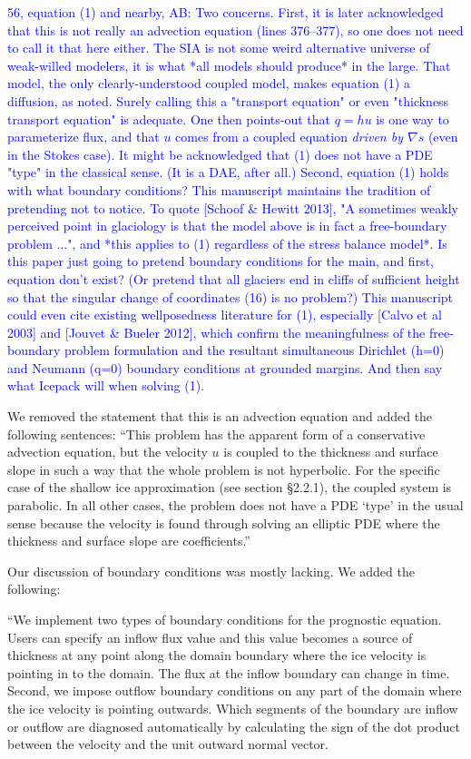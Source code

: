 \documentclass{article}
\theoremstyle{definition}
\theoremstyle{plain}
\begin{document}
\textcolor{blue}{56, equation (1) and nearby, AB:  Two concerns.  First, it is later acknowledged that this is not really an advection equation (lines 376--377), so one does not need to call it that here either.  The SIA is not some weird alternative universe of weak-willed modelers, it is what *all models should produce* in the large.  That model, the only clearly-understood coupled model, makes equation (1) a diffusion, as noted.  Surely calling this a "transport equation" or even "thickness transport equation" is adequate.  One then points-out that $q=hu$ is one way to parameterize flux, and that $u$ comes from a coupled equation \emph{driven by $\nabla s$} (even in the Stokes case).  It might be acknowledged that (1) does not have a PDE "type" in the classical sense.  (It is a DAE, after all.)  Second, equation (1) holds with what boundary conditions?  This manuscript maintains the tradition of pretending not to notice.  To quote [Schoof \& Hewitt 2013], "A sometimes weakly perceived point in glaciology is that the model above is in fact a free-boundary problem ...", and *this applies to (1) regardless of the stress balance model*.  Is this paper just going to pretend boundary conditions for the main, and first, equation don't exist?  (Or pretend that all glaciers end in cliffs of sufficient height so that the singular change of coordinates (16) is no problem?)  This manuscript could even cite existing wellposedness literature for (1), especially [Calvo et al 2003] and [Jouvet \& Bueler 2012], which confirm the meaningfulness of the free-boundary problem formulation and the resultant simultaneous Dirichlet (h=0) and Neumann (q=0) boundary conditions at grounded margins.  And then say what Icepack will when solving (1).}

We removed the statement that this is an advection equation and added the following sentences:
``This problem has the apparent form of a conservative advection equation, but the velocity $u$ is coupled to the thickness and surface slope in such a way that the whole problem is not hyperbolic.
For the specific case of the shallow ice approximation (see section \S2.2.1), the coupled system is parabolic.
In all other cases, the problem does not have a PDE `type' in the usual sense because the velocity is found through solving an elliptic PDE where the thickness and surface slope are coefficients.''

Our discussion of boundary conditions was mostly lacking.
We added the following:

``We implement two types of boundary conditions for the prognostic equation.
Users can specify an inflow flux value and this value becomes a source of thickness at any point along the domain boundary where the ice velocity is pointing in to the domain.
The flux at the inflow boundary can change in time.
Second, we impose outflow boundary conditions on any part of the domain where the ice velocity is pointing outwards.
Which segments of the boundary are inflow or outflow are diagnosed automatically by calculating the sign of the dot product between the velocity and the unit outward normal vector.
\end{document}
